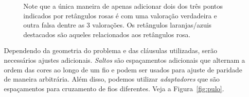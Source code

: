 \begin{figure}
    \caption{Note que a única maneira de apenas adicionar dois dos três pontos indicados por retângulos rosas é com uma valoração verdadeira e outra falsa dentre as 3 valorações. Os retângulos laranjas/azuis destacados são aqueles relacionados aos retângulos rosa.}
\label{fig:clausula}
\end{figure}

Dependendo da geometria do problema e das cláusulas utilizadas, serão necessários ajustes adicionais. \textit{Saltos} são espaçamentos adicionais que alternam a ordem das cores ao longo de um fio e podem ser usados para ajuste de paridade de maneira arbitrária. Além disso, podemos utilizar \textit{adaptadores} que são espaçamentos para cruzamento de fios diferentes. Veja a Figura~\ref{fig:pulo}.

